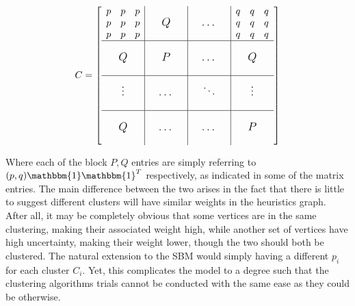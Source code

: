 \documentclass{article}
\begin{document}
\[
\sbox0{$\begin{matrix}p&p&p\\p&p&p\\p&p&p\end{matrix}$}
\sbox1{$\begin{matrix}q&q&q\\q&q&q\\q&q&q\end{matrix}$}
%
C=\left[
\begin{array}{c|c|c|c}
\usebox{0}&\makebox[\wd0]{\large $Q$}&\makebox[\wd0]{\large $\dots$}&\usebox{1}\\
\hline
\vphantom{\usebox{0}}\makebox[\wd0]{\large $Q$}&\makebox[\wd0]{\large $P$}&\makebox[\wd0]{\large $\dots$}&\makebox[\wd0]{\large $Q$}\\
\hline
\vphantom{\usebox{0}}\makebox[\wd0]{\large $\vdots$}&\makebox[\wd0]{\large $\dots$}&\makebox[\wd0]{\large $\ddots$}&\makebox[\wd0]{\large $\vdots$}\\
\hline
\vphantom{\usebox{0}}\makebox[\wd0]{\large $Q$}&\makebox[\wd0]{\large $\dots$}&\makebox[\wd0]{\large $\dots$}&\makebox[\wd0]{\large $P$}\\
\end{array}
\right]
\]

Where each of the block $P,Q$ entries are simply referring to $(p,q)\mathbbm{1}\mathbbm{1}^T$ respectively, as indicated in some of the matrix entries. The main difference between the two arises in the fact that there is little to suggest different clusters will have similar weights in the heuristics graph. After all, it may be completely obvious that some vertices are in the same clustering, making their associated weight high, while another set of vertices have high uncertainty, making their weight lower, though the two should both be clustered. The natural extension to the SBM would simply having a different $p_i$ for each cluster $C_i$. Yet, this complicates the model to a degree such that the clustering algorithms trials cannot be conducted with the same ease as they could be otherwise. 
\end{document}
